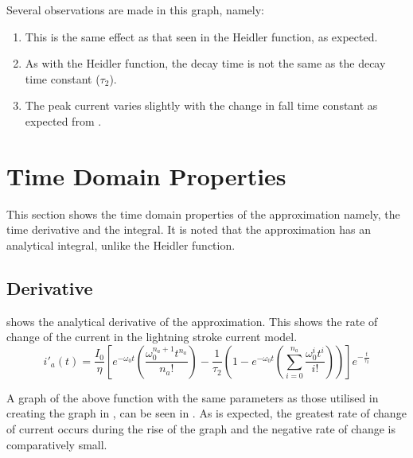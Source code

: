 Several observations are made in this graph, namely:
\begin{enumerate}
    \item This is the same effect as that seen in the Heidler function, as expected.
    \item As with the Heidler function, the decay time is not the same as the decay time constant ($\tau_2$).
    \item The peak current varies slightly with the change in fall time constant as expected from .
\end{enumerate}


\section{Time Domain Properties}
\label{sec:approx_time_domain_analysis}
This section shows the time domain properties of the approximation namely, the time derivative and the integral. It is noted that the approximation has an analytical integral, unlike the Heidler function.

\subsection{Derivative}
\label{sub:approx_derivative}
 shows the analytical derivative of the approximation. This shows the rate of change of the current in the lightning stroke current model.
\begin{equation}
    i'_{a} \left( t \right) = \frac{I_0}{\eta} \left [ e^{-\omega_0 t} \left ( \frac{\omega_0^{n_a+1} t^{n_a}}{n_a!} \right ) - \frac{1}{\tau_2} \left ( 1 - e^{-\omega_0 t}\left ( \sum_{i=0}^{n_a} \frac{\omega_0^{i} t^i}{i!} \right ) \right ) \right ] e^{-\frac{t}{\tau_2}}
    \label{eqn:approx_deriv}
\end{equation}

A graph of the above function with the same parameters as those utilised in creating the graph in , can be seen in .
As is expected, the greatest rate of change of current occurs during the rise of the graph and the negative rate of change is comparatively small.

